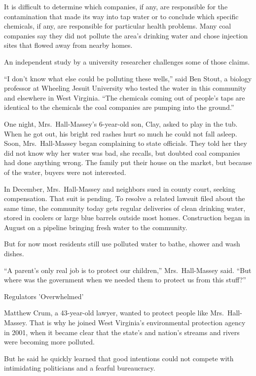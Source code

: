 ﻿\documentclass[12pt]{article}
\begin{document}
It is difficult to determine which companies, if any, are responsible for the contamination that
made its way into tap water or to conclude which specific chemicals, if any, are responsible for
particular health problems. Many coal companies say they did not pollute the area's drinking water
and chose injection sites that flowed away from nearby homes.

An independent study by a university researcher challenges some of those claims.

``I don't know what else could be polluting these wells,'' said Ben Stout, a biology professor at
Wheeling Jesuit University who tested the water in this community and elsewhere in West Virginia.
``The chemicals coming out of people's taps are identical to the chemicals the coal companies are
pumping into the ground.''

One night, Mrs.~Hall-Massey's 6-year-old son, Clay, asked to play in the tub. When he got out, his
bright red rashes hurt so much he could not fall asleep. Soon, Mrs.~Hall-Massey began complaining to
state officials. They told her they did not know why her water was bad, she recalls, but doubted
coal companies had done anything wrong. The family put their house on the market, but because of the
water, buyers were not interested.

In December, Mrs.~Hall-Massey and neighbors sued in county court, seeking compensation. That suit is
pending. To resolve a related lawsuit filed about the same time, the community today gets regular
deliveries of clean drinking water, stored in coolers or large blue barrels outside most homes.
Construction began in August on a pipeline bringing fresh water to the community.

But for now most residents still use polluted water to bathe, shower and wash dishes.

``A parent's only real job is to protect our children,'' Mrs.~Hall-Massey said. ``But where was the
government when we needed them to protect us from this stuff?''

Regulators 'Overwhelmed'

Matthew Crum, a 43-year-old lawyer, wanted to protect people like Mrs.~Hall-Massey. That is why he
joined West Virginia's environmental protection agency in 2001, when it became clear that the
state's and nation's streams and rivers were becoming more polluted.

But he said he quickly learned that good intentions could not compete with intimidating politicians
and a fearful bureaucracy.
\end{document}
